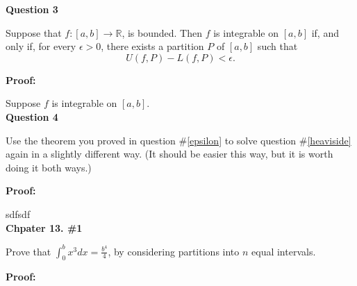 \documentclass[a4paper,12pt]{report}
\newcommand{\R}{\mathbb{R}}
\begin{document}
\noindent
\textbf{Question 3}

\noindent
Suppose that $f:[a,b]\to\R$,
is bounded. Then $f$ is integrable on $[a,b]$
if, and only if, for every $\epsilon>0$, there
exists a partition $P$ of $[a,b]$ such
that
\[
U(f,P)-L(f,P)<\epsilon.
\]

\noindent
\textbf{Proof: }

\noindent
Suppose $f$ is integrable on $[a,b]$. \\

\noindent
\textbf{Question 4}

\noindent
Use the theorem you proved in 
question \#\ref{epsilon} to solve 
question \#\ref{heaviside} again 
in a slightly different way. (It 
should be easier this way, but it is
worth doing it both ways.)

\noindent
\textbf{Proof: }

\noindent
sdfsdf\\

\noindent
\textbf{Chpater 13. \#1}

\noindent
Prove that $\int_{0}^{b}x^3dx=\frac{b^4}{4}$, by considering partitions into $n$ equal intervals. 

\noindent
\textbf{Proof: }
\end{document}
